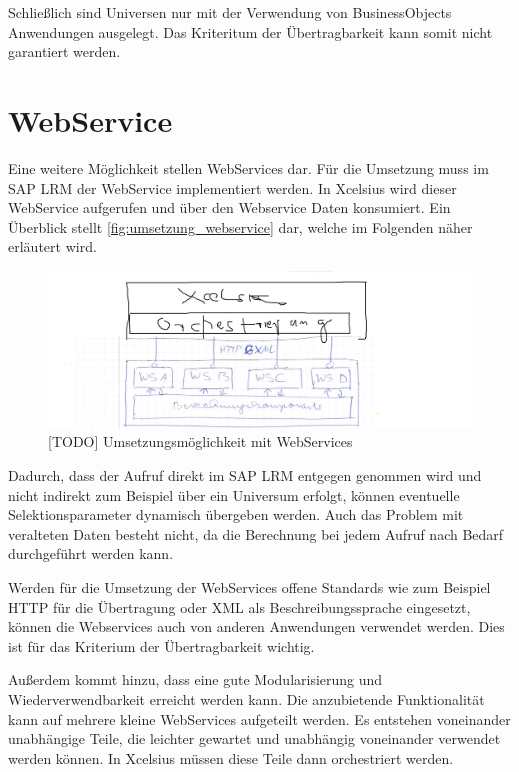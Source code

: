 Schließlich sind Universen nur mit der Verwendung von BusinessObjects Anwendungen ausgelegt. Das Kriteritum der Übertragbarkeit kann somit nicht garantiert werden.

\section{WebService}
Eine weitere Möglichkeit stellen WebServices dar. Für die Umsetzung muss im SAP LRM der WebService implementiert werden. In Xcelsius wird dieser WebService aufgerufen und über den Webservice Daten konsumiert. Ein Überblick stellt \vref{fig:umsetzung_webservice} dar, welche im Folgenden näher erläutert wird.

\begin{figure}[h]
\centering
\setlength{\unitlength}{1mm}
\includegraphics[width=15cm]{images/umsetzung_webservice.jpg}
\caption{[TODO] Umsetzungsmöglichkeit mit WebServices\label{fig:umsetzung_webservice}}
\end{figure}

Dadurch, dass der Aufruf direkt im SAP LRM entgegen genommen wird und nicht indirekt zum Beispiel über ein Universum erfolgt, können eventuelle Selektionsparameter dynamisch übergeben werden. Auch das Problem mit veralteten Daten besteht nicht, da die Berechnung bei jedem Aufruf nach Bedarf durchgeführt werden kann.

Werden für die Umsetzung der WebServices offene Standards wie zum Beispiel HTTP für die Übertragung oder XML als Beschreibungssprache eingesetzt, können die Webservices auch von anderen Anwendungen verwendet werden. Dies ist für das Kriterium der Übertragbarkeit wichtig.

Außerdem kommt hinzu, dass eine gute Modularisierung und Wiederverwendbarkeit erreicht werden kann. Die anzubietende Funktionalität kann auf mehrere kleine WebServices aufgeteilt werden. Es entstehen voneinander unabhängige Teile, die leichter gewartet und unabhängig voneinander verwendet werden können. In Xcelsius müssen diese Teile dann orchestriert werden.

